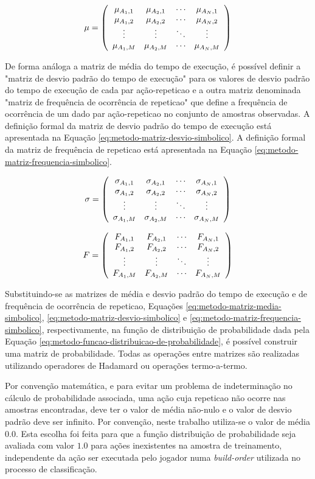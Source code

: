 \begin{equation}
	\mu =  \left(\begin{array}{cccc} {\mu}_{A_1,1} & {\mu}_{A_2,1} & \cdots & {\mu}_{A_N,1} \\ {\mu}_{A_1,2} & {\mu}_{A_2,2} & \cdots & {\mu}_{A_N,2} \\ \vdots & \vdots & \ddots & \vdots \\ {\mu}_{A_1,M} & {\mu}_{A_2,M} & \cdots & {\mu}_{A_N,M} \end{array}\right) 
	\label{eq:metodo-matriz-media-simbolico}
\end{equation}

De forma análoga a matriz de média do tempo de execução, é possível definir a "matriz de desvio padrão do tempo de execução" para os valores de desvio padrão do tempo de execução de cada par ação-\gls{repeticao} e a outra matriz denominada "matriz de frequência de ocorrência de \gls{repeticao}" que define a frequência de ocorrência de um dado par ação-\gls{repeticao} no conjunto de amostras observadas. A definição formal da matriz de desvio padrão do tempo de execução está apresentada na Equação \ref{eq:metodo-matriz-desvio-simbolico}. A definição formal da matriz de frequência de \gls{repeticao} está apresentada na Equação \ref{eq:metodo-matriz-frequencia-simbolico}.

\begin{equation}
	\sigma =  \left(\begin{array}{cccc} {\sigma}_{A_1,1} & {\sigma}_{A_2,1} & \cdots & {\sigma}_{A_N,1} \\ {\sigma}_{A_1,2} & {\sigma}_{A_2,2} & \cdots & {\sigma}_{A_N,2} \\ \vdots & \vdots & \ddots & \vdots \\ {\sigma}_{A_1,M} & {\sigma}_{A_2,M} & \cdots & {\sigma}_{A_N,M} \end{array}\right) 
	\label{eq:metodo-matriz-desvio-simbolico}
\end{equation}

\begin{equation}
	F =  \left(\begin{array}{cccc} {F}_{A_1,1} & {F}_{A_2,1} & \cdots & {F}_{A_N,1} \\ {F}_{A_1,2} & {F}_{A_2,2} & \cdots & {F}_{A_N,2} \\ \vdots & \vdots & \ddots & \vdots \\ {F}_{A_1,M} & {F}_{A_2,M} & \cdots & {F}_{A_N,M} \end{array}\right) 
	\label{eq:metodo-matriz-frequencia-simbolico}
\end{equation}

Substituindo-se as matrizes de média e desvio padrão do tempo de execução e de frequência de ocorrência de \gls{repeticao}, Equações \ref{eq:metodo-matriz-media-simbolico}, \ref{eq:metodo-matriz-desvio-simbolico} e \ref{eq:metodo-matriz-frequencia-simbolico}, respectivamente, na função de distribuição de probabilidade dada pela Equação \ref{eq:metodo-funcao-distribuicao-de-probabilidade}, é possível construir uma matriz de probabilidade. Todas as operações entre matrizes são realizadas utilizando operadores de Hadamard \cite{matrix-analysis} ou operações termo-a-termo.

Por convenção matemática, e para evitar um problema de indeterminação no cálculo de probabilidade associada, uma ação cuja \gls{repeticao} não ocorre nas amostras encontradas, deve ter o valor de média não-nulo e o valor de desvio padrão deve ser infinito. Por convenção, neste trabalho utiliza-se o valor de média $0.0$. Esta escolha foi feita para que a função distribuição de probabilidade seja avaliada com valor $1.0$ para ações inexistentes na amostra de treinamento, independente da ação ser executada pelo jogador numa \textit{\gls{build-order}} utilizada no processo de classificação.


